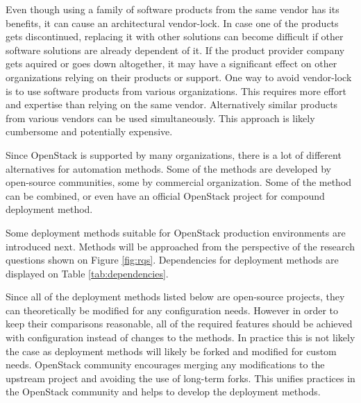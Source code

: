 \documentclass[officiallayout]{tktla}
\begin{document}
Even though using a family of software products from the same vendor has its
benefits, it can cause an architectural vendor-lock. In case one of the
products gets discontinued, replacing it with other solutions can become
difficult if other software solutions are already dependent of it. If the
product provider company gets aquired or goes down altogether, it may have a
significant effect on other organizations relying on their products or support.
One way to avoid vendor-lock is to use software products from various
organizations. This requires more effort and expertise than relying on the same
vendor. Alternatively similar products from various vendors can be used
simultaneously. This approach is likely cumbersome and potentially expensive.

Since OpenStack is supported by many organizations, there is a lot of different
alternatives for automation methods. Some of the methods are developed by
open-source communities, some by commercial organization. Some of the method
can be combined, or even have an official OpenStack project for compound
deployment method.

Some deployment methods suitable for OpenStack production environments are
introduced next. Methods will be approached from the perspective of the
research questions shown on Figure \ref{fig:rqs}. Dependencies for deployment
methods are displayed on Table \ref{tab:dependencies}.

Since all of the deployment methods listed below are open-source projects, they
can theoretically be modified for any configuration needs. However in order to
keep their comparisons reasonable, all of the required features should be
achieved with configuration instead of changes to the methods. In practice this
is not likely the case as deployment methods will likely be forked and modified
for custom needs. OpenStack community encourages merging any modifications to
the upstream project and avoiding the use of long-term forks. This unifies
practices in the OpenStack community and helps to develop the deployment
methods.
\end{document}
